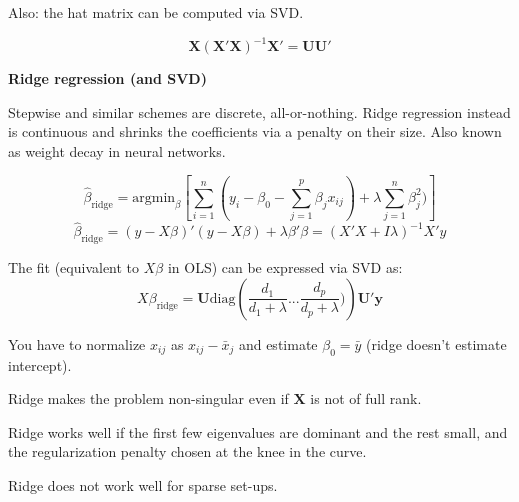 \documentclass{minimal}
\begin{document}
Also: the hat matrix can be computed via SVD.

$$
\mathbf{X}(\mathbf{X}'\mathbf{X})^{-1}\mathbf{X}' = \mathbf{UU}'
$$

\medskip
\textbf{Ridge regression (and SVD)}

Stepwise and similar schemes are discrete, all-or-nothing. Ridge regression instead is continuous and
shrinks the coefficients via a penalty on their size. Also known as weight decay in neural networks.

$$
\hat{\beta}_{\mathrm{ridge}} = \mathrm{argmin}_\beta \left [ \sum_{i=1}^n (y_i -
\beta_0 - \sum_{j=1}^p \beta_j x_{ij}) + \lambda \sum_{j=1}^n \beta^2_j) \right ]
$$
$$
\hat{\beta}_{\mathrm{ridge}} = (y-X\beta)'(y-X\beta) + \lambda \beta'\beta =
(X'X+I\lambda)^{-1}X'y
$$


The fit (equivalent to $X\beta$ in OLS) can be expressed via SVD as:
$$
X\beta_{\mathrm{ridge}} = \mathbf{U}
\mathrm{diag}\left (\frac{d_1}{d_1+\lambda}...\frac{d_p}{d_p + \lambda})\right )
\mathbf{U}'\mathbf{y}
$$

You have to normalize $x_{ij}$ as $x_{ij}-\bar{x}_j$ and estimate
$\beta_0=\bar{y}$ (ridge doesn't estimate intercept).


Ridge makes the problem non-singular even if $\mathbf{X}$ is not of full rank.

Ridge works well if the first few eigenvalues are dominant and the rest small,
and the regularization penalty chosen at the knee in the curve.

Ridge does not work well for sparse set-ups.
\end{document}
